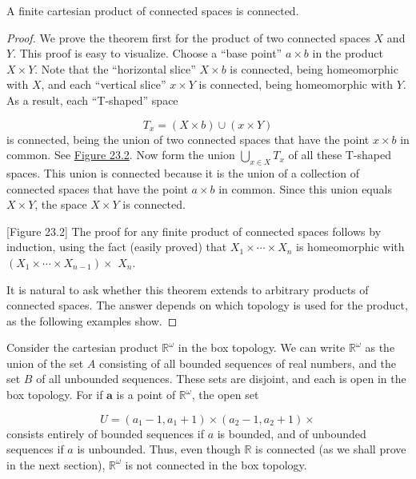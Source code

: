 \begin{theorem}
\label{thm:\thetheorem}
A finite cartesian product of connected spaces is connected.
\end{theorem}

\begin{proof}
We prove the theorem first for the product of two connected spaces \(X\) and \(Y\). This proof is easy to visualize. Choose a ``base point'' \(a \times b\) in the product \(X \times Y\). Note that the ``horizontal slice'' \(X \times b\) is connected, being homeomorphic with \(X\), and each ``vertical slice'' \(x \times Y\) is connected, being homeomorphic with \(Y\). As a result, each ``T-shaped'' space

\[
T_{x} = ( {X \times b}) \cup ( {x \times Y})
\]
is connected, being the union of two connected spaces that have the point \(x \times b\) in common. See \hyperref[fig:23.2]{Figure 23.2}. Now form the union \(\mathop{\bigcup }\limits_{{x \in X}}T_{x}\) of all these T-shaped spaces. This union is connected because it is the union of a collection of connected spaces that have the point \(a \times b\) in common. Since this union equals \(X \times Y\), the space \(X \times Y\) is connected.

[Figure 23.2]
The proof for any finite product of connected spaces follows by induction, using the fact (easily proved) that \(X_{1} \times \cdots \times {X}_{n}\) is homeomorphic with \(( {X_{1} \times \cdots \times {X}_{n - 1}}) \times\) \(X_{n}\).

It is natural to ask whether this theorem extends to arbitrary products of connected spaces. The answer depends on which topology is used for the product, as the following examples show.
\end{proof}

\begin{centeredblock}
\begin{example}
\label{ex:\thesection.\theexample}
 Consider the cartesian product \(\mathbb{R}^{\omega }\) in the box topology. We can write \(\mathbb{R}^{\omega }\) as the union of the set \(A\) consisting of all bounded sequences of real numbers, and the set \(B\) of all unbounded sequences. These sets are disjoint, and each is open in the box topology. For if \(\mathbf{a}\) is a point of \(\mathbb{R}^{\omega }\), the open set

 \[
 U = ( {a_{1} - 1,a_{1} + 1}) \times ( {a_{2} - 1,a_{2} + 1}) \times
 \]
consists entirely of bounded sequences if \(a\) is bounded, and of unbounded sequences if \(a\) is unbounded. Thus, even though \(\mathbb{R}\) is connected (as we shall prove in the next section), \(\mathbb{R}^{\omega }\) is not connected in the box topology.
\end{example}
\end{centeredblock}

